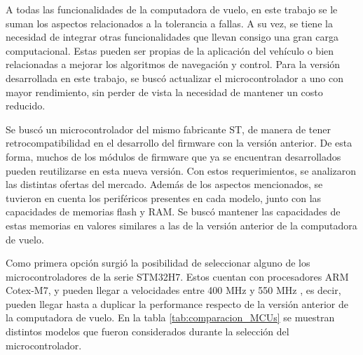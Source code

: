 A todas las funcionalidades de la computadora de vuelo, en este trabajo se le suman los aspectos relacionados a la tolerancia a fallas. A su vez, se tiene la necesidad de integrar otras funcionalidades que llevan consigo una gran carga computacional. Estas pueden ser propias de la aplicación del vehículo o bien relacionadas a mejorar los algoritmos de navegación y control. Para la versión desarrollada en este trabajo, se buscó actualizar el microcontrolador a uno con mayor rendimiento, sin perder de vista la necesidad de mantener un costo reducido.

Se buscó un microcontrolador del mismo fabricante ST, de manera de tener retrocompatibilidad en el desarrollo del firmware con la versión anterior. De esta forma, muchos de los módulos de firmware que ya se encuentran desarrollados pueden reutilizarse en esta nueva versión. Con estos requerimientos, se analizaron las distintas ofertas del mercado. Además de los aspectos mencionados, se tuvieron en cuenta los periféricos presentes en cada modelo, junto con las capacidades de memorias flash y RAM. Se buscó mantener las capacidades de estas memorias en valores similares a las de la versión anterior de la computadora de vuelo.

Como primera opción surgió la posibilidad de seleccionar alguno de los microcontroladores de la serie STM32H7. Estos cuentan con procesadores ARM Cotex-M7, y pueden llegar a velocidades entre 400 MHz y 550 MHz \cite{AN5293}, es decir, pueden llegar hasta a duplicar la performance respecto de la versión anterior de la computadora de vuelo. En la tabla \ref{tab:comparacion_MCUs} se muestran distintos modelos que fueron considerados durante la selección del microcontrolador.

